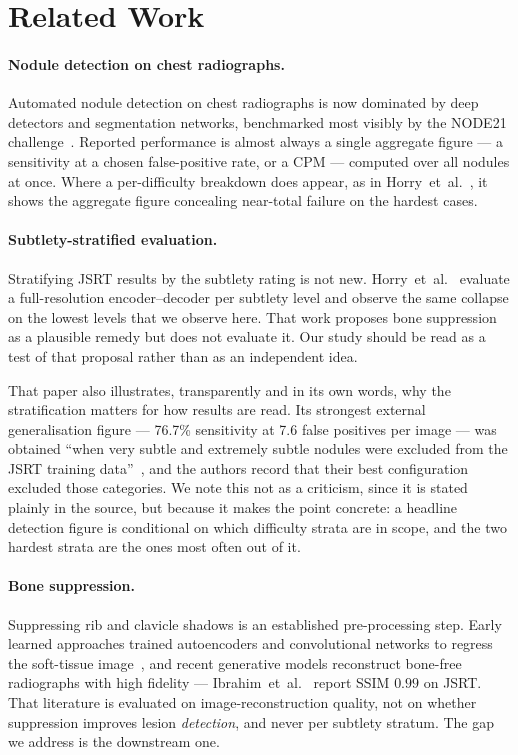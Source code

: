 \documentclass[11pt,a4paper]{article}
\begin{document}
\section{Related Work}

\paragraph{Nodule detection on chest radiographs.}
Automated nodule detection on chest radiographs is now dominated by deep
detectors and segmentation networks, benchmarked most visibly by the NODE21
challenge~\cite{sogancioglu2024node21}. Reported performance is almost always a
single aggregate figure --- a sensitivity at a chosen false-positive rate, or a
CPM --- computed over all nodules at once. Where a per-difficulty breakdown does
appear, as in Horry~et~al.~\cite{horry2023fullres}, it shows the aggregate
figure concealing near-total failure on the hardest cases.

\paragraph{Subtlety-stratified evaluation.}
Stratifying JSRT results by the subtlety rating is not new.
Horry~et~al.~\cite{horry2023fullres} evaluate a full-resolution
encoder--decoder per subtlety level and observe the same collapse on the lowest
levels that we observe here. That work proposes bone suppression as a plausible
remedy but does not evaluate it. Our study should be read as a test of that
proposal rather than as an independent idea.

That paper also illustrates, transparently and in its own words, why the
stratification matters for how results are read. Its strongest external
generalisation figure --- 76.7\% sensitivity at 7.6 false positives per image
--- was obtained ``when very subtle and extremely subtle nodules were excluded
from the JSRT training data''~\cite{horry2023fullres}, and the authors record
that their best configuration excluded those categories. We note this not as a
criticism, since it is stated plainly in the source, but because it makes the
point concrete: a headline detection figure is conditional on which difficulty
strata are in scope, and the two hardest strata are the ones most often out of
it.

\paragraph{Bone suppression.}
Suppressing rib and clavicle shadows is an established pre-processing step.
Early learned approaches trained autoencoders and convolutional networks to
regress the soft-tissue image~\cite{gusarev2017bonesup}, and recent generative
models reconstruct bone-free radiographs with high fidelity ---
Ibrahim~et~al.~\cite{ibrahim2025bonesup} report SSIM $0.99$ on JSRT. That
literature is evaluated on image-reconstruction quality, not on whether
suppression improves lesion \emph{detection}, and never per subtlety stratum.
The gap we address is the downstream one.
\end{document}
